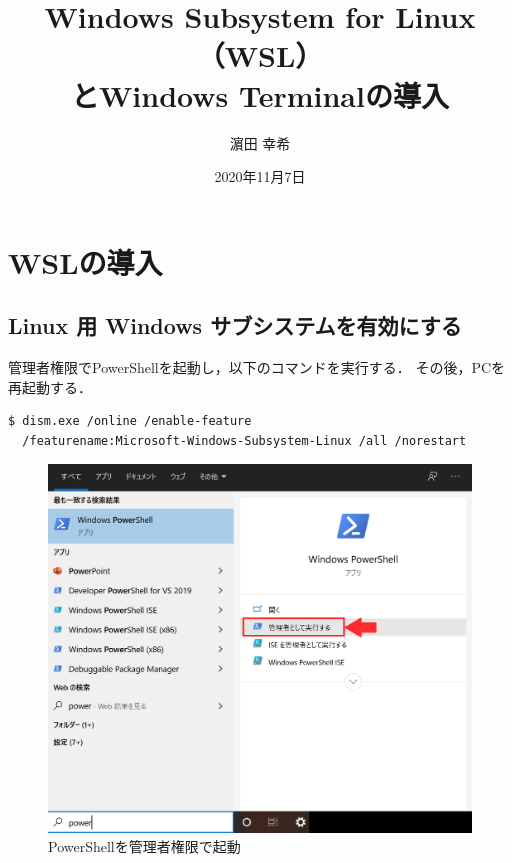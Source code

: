 \documentclass[uplatex]{jsarticle}
\begin{document}
\title{Windows Subsystem for Linux（WSL）\\とWindows Terminalの導入}
\author{濵田 幸希}
\date{2020年11月7日}
\maketitle

\tableofcontents

\newpage
\section{WSLの導入}
\subsection{Linux 用 Windows サブシステムを有効にする}
管理者権限でPowerShellを起動し，以下のコマンドを実行する．
その後，PCを再起動する．
\vspace{5pt}

\begin{lstlisting}[style=command]
$ dism.exe /online /enable-feature 
  /featurename:Microsoft-Windows-Subsystem-Linux /all /norestart
\end{lstlisting}


\begin{figure}[h]
\centering
\includegraphics[scale=0.5]{./図/powershell.png}
\caption{PowerShellを管理者権限で起動}
\label{fig:powershell}
\end{figure}
\end{document}
